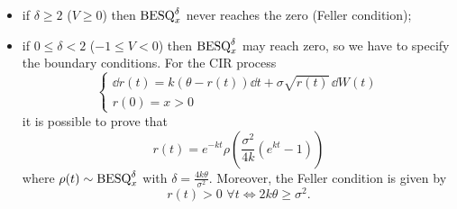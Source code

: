 \begin{itemize}
    \item if $\delta \ge 2$ ($V\ge0$) then $\text{BESQ}^{\delta}_x$ never reaches the zero (Feller condition);
    \item if $0\le\delta<2$ ($-1\le V<0$) then $\text{BESQ}^{\delta}_x$ may reach zero, so we have to specify the boundary conditions. For the CIR process
    \begin{equation*}
        \begin{cases}
            \dd r(t) = k(\theta - r(t))\dd t + \sigma\sqrt{r(t)}\,\dd W(t) \\
            r(0) = x > 0
        \end{cases}
    \end{equation*}
    it is possible to prove that
    \begin{equation*}
        r(t) = e^{-kt}\rho\left(\frac{\sigma^2}{4k}(e^{kt}-1)\right)
    \end{equation*}
    where $\rho(t)\sim \text{BESQ}^{\delta}_x$ with $\delta = \tfrac{4k\theta}{\sigma^2}$. Moreover, the Feller condition is given by
    \begin{equation*}
        r(t) > 0\,\, \forall t \Leftrightarrow 2k\theta \ge \sigma^2.
    \end{equation*}
\end{itemize}

